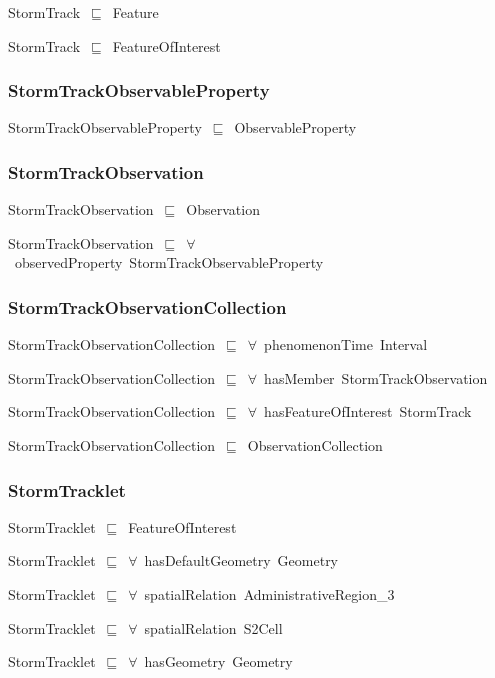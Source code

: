 \documentclass{article}
\begin{document}
StormTrack~\ensuremath{\sqsubseteq}~Feature~

StormTrack~\ensuremath{\sqsubseteq}~FeatureOfInterest~

\subsubsection*{StormTrackObservableProperty}

StormTrackObservableProperty~\ensuremath{\sqsubseteq}~ObservableProperty~

\subsubsection*{StormTrackObservation}

StormTrackObservation~\ensuremath{\sqsubseteq}~Observation~

StormTrackObservation~\ensuremath{\sqsubseteq}~\ensuremath{\forall}~observedProperty~StormTrackObservableProperty~

\subsubsection*{StormTrackObservationCollection}

StormTrackObservationCollection~\ensuremath{\sqsubseteq}~\ensuremath{\forall}~phenomenonTime~Interval~

StormTrackObservationCollection~\ensuremath{\sqsubseteq}~\ensuremath{\forall}~hasMember~StormTrackObservation~

StormTrackObservationCollection~\ensuremath{\sqsubseteq}~\ensuremath{\forall}~hasFeatureOfInterest~StormTrack~

StormTrackObservationCollection~\ensuremath{\sqsubseteq}~ObservationCollection~

\subsubsection*{StormTracklet}

StormTracklet~\ensuremath{\sqsubseteq}~FeatureOfInterest~

StormTracklet~\ensuremath{\sqsubseteq}~\ensuremath{\forall}~hasDefaultGeometry~Geometry~

StormTracklet~\ensuremath{\sqsubseteq}~\ensuremath{\forall}~spatialRelation~AdministrativeRegion\_3~

StormTracklet~\ensuremath{\sqsubseteq}~\ensuremath{\forall}~spatialRelation~S2Cell~

StormTracklet~\ensuremath{\sqsubseteq}~\ensuremath{\forall}~hasGeometry~Geometry~
\end{document}
